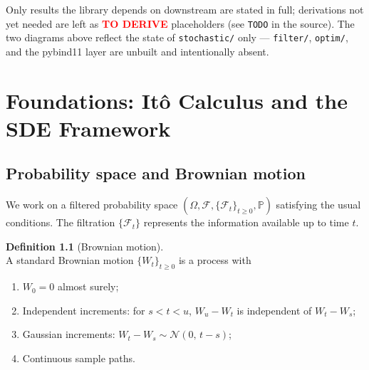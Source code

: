 \documentclass[11pt]{report}
\newcommand{\Prob}{\mathbb{P}}
\newcommand{\filt}{\mathcal{F}}
\newcommand{\Om}{\Omega}
\theoremstyle{plain}
\theoremstyle{definition}
\newtheorem{definition}{Definition}[chapter]
\theoremstyle{remark}
\numberwithin{equation}{chapter}
\begin{document}
Only results the library depends on downstream are stated in full;
derivations not yet needed are left as
\textbf{\textcolor{red}{TO DERIVE}} placeholders (see \texttt{TODO} in
the source). The two diagrams above reflect the state of
\texttt{stochastic/} only --- \texttt{filter/}, \texttt{optim/}, and
the pybind11 layer are unbuilt and intentionally absent.

\chapter{Foundations: It\^o Calculus and the SDE Framework}
\section{Probability space and Brownian motion}

We work on a filtered probability space
$(\Om, \filt, \{\filt_t\}_{t\ge 0}, \Prob)$ satisfying the usual
conditions. The filtration $\{\filt_t\}$ represents the information
available up to time $t$.

\begin{definition}[Brownian motion]
\leavevmode\\A standard Brownian motion $\{W_t\}_{t\ge 0}$ is a process with
\begin{enumerate}
  \item $W_0 = 0$ almost surely;
  \item Independent increments: for $s < t < u $, $W_u - W_t$ is
        independent of $W_t - W_s$;
  \item Gaussian increments: $W_t - W_s \sim \mathcal{N}(0,\, t-s)$;
  \item Continuous sample paths.
\end{enumerate}
\end{definition}
\end{document}
